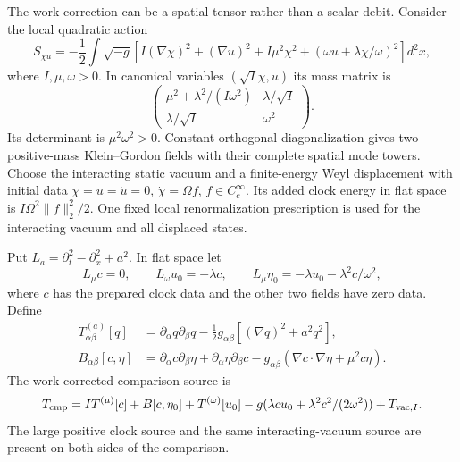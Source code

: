 \documentclass[12pt,a4paper]{article}
\begin{document}
The work correction can be a spatial tensor rather than a scalar debit.
Consider the local quadratic action
\begin{equation}
 S_{\chi u}=-\frac12\int\sqrt{-g}\left[
 I(\nabla\chi)^2+(\nabla u)^2+I\mu^2\chi^2+
                      (\omega u+\lambda\chi/\omega)^2\right]d^2x,
 \label{eq:spatial-clock-action}
\end{equation}
where $I,\mu,\omega>0$. In canonical variables $(\sqrt I\chi,u)$
its mass matrix is
\[
 \begin{pmatrix}\mu^2+\lambda^2/(I\omega^2)&\lambda/\sqrt I\\
                 \lambda/\sqrt I&\omega^2\end{pmatrix}.
\]
Its determinant is $\mu^2\omega^2>0$. Constant orthogonal
diagonalization gives two positive-mass Klein--Gordon fields with
their complete spatial mode towers. Choose the interacting static
vacuum and a finite-energy Weyl displacement with initial data
$\chi=u=\dot u=0$, $\dot\chi=\Omega f$,
$f\in C_c^\infty$. Its added clock energy in flat space is
$I\Omega^2\|f\|_2^2/2$. One fixed local renormalization prescription
is used for the interacting vacuum and all displaced states.

Put $L_a=\partial_t^2-\partial_x^2+a^2$. In flat space let
\begin{equation}
 L_\mu c=0,\qquad L_\omega u_0=-\lambda c,\qquad
 L_\mu\eta_0=-\lambda u_0-\lambda^2c/\omega^2,
 \label{eq:spatial-retarded-work}
\end{equation}
where $c$ has the prepared clock data and the other two fields have
zero data. Define
\begin{align}
 T^{(a)}_{\alpha\beta}[q]
  &=\partial_\alpha q\partial_\beta q-\tfrac12g_{\alpha\beta}
                         [(\nabla q)^2+a^2q^2],\\
 B_{\alpha\beta}[c,\eta]
  &=\partial_\alpha c\partial_\beta\eta+
    \partial_\alpha\eta\partial_\beta c
      -g_{\alpha\beta}(\nabla c\cdot\nabla\eta+\mu^2c\eta).
\end{align}
The work-corrected comparison source is
\begin{equation}
 T_{\rm cmp}=I T^{(\mu)}[c]+B[c,\eta_0]+T^{(\omega)}[u_0]
       -g(\lambda c u_0+\lambda^2c^2/(2\omega^2))+T_{{\rm vac},I}.
 \label{eq:spatial-comparison}
\end{equation}
The large positive clock source and the same interacting-vacuum
source are present on both sides of the comparison.
\end{document}
